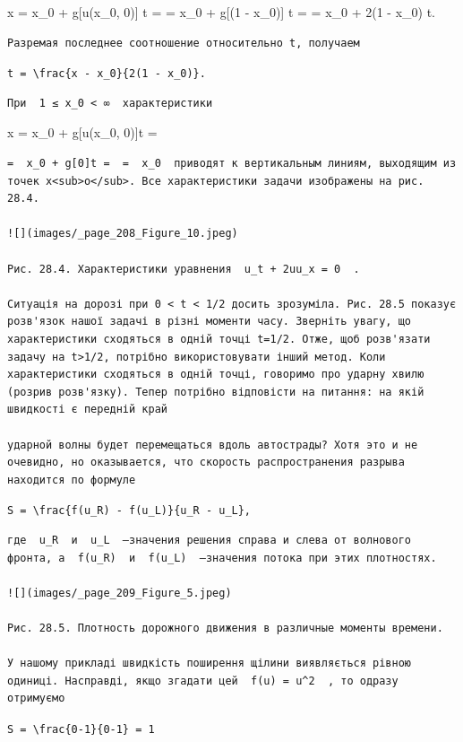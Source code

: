 \documentclass[
  ukrainian,
]{article}
\begin{document}
x = x\_0 + g{[}u(x\_0, 0){]} t = = x\_0 + g{[}(1 - x\_0){]} t = = x\_0 +
2(1 - x\_0) t.

\begin{verbatim}
Разремая последнее соотношение относительно t, получаем
\end{verbatim}

\texttt{t\ =\ \textbackslash{}frac\{x\ -\ x\_0\}\{2(1\ -\ x\_0)\}.}

\begin{verbatim}
При  1 ≤ x_0 < ∞  характеристики
\end{verbatim}

x = x\_0 + g{[}u(x\_0, 0){]}t =

\begin{verbatim}
=  x_0 + g[0]t =  =  x_0  приводят к вертикальным линиям, выходящим из точек х<sub>о</sub>. Все характеристики задачи изображены на рис. 28.4.

![](images/_page_208_Figure_10.jpeg)

Рис. 28.4. Характеристики уравнения  u_t + 2uu_x = 0  .

Ситуація на дорозі при 0 < t < 1/2 досить зрозуміла. Рис. 28.5 показує розв'язок нашої задачі в різні моменти часу. Зверніть увагу, що характеристики сходяться в одній точці t=1/2. Отже, щоб розв'язати задачу на t>1/2, потрібно використовувати інший метод. Коли характеристики сходяться в одній точці, говоримо про ударну хвилю (розрив розв'язку). Тепер потрібно відповісти на питання: на якій швидкості є передній край

ударной волны будет перемещаться вдоль автострады? Хотя это и не очевидно, но оказывается, что скорость распространения разрыва находится по формуле
\end{verbatim}

\texttt{S\ =\ \textbackslash{}frac\{f(u\_R)\ -\ f(u\_L)\}\{u\_R\ -\ u\_L\},}

\begin{verbatim}
где  u_R  и  u_L  —значения решения справа и слева от волнового фронта, а  f(u_R)  и  f(u_L)  —значения потока при этих плотностях.

![](images/_page_209_Figure_5.jpeg)

Рис. 28.5. Плотность дорожного движения в различные моменты времени.

У нашому прикладі швидкість поширення щілини виявляється рівною одиниці. Насправді, якщо згадати цей  f(u) = u^2  , то одразу отримуємо
\end{verbatim}

\texttt{S\ =\ \textbackslash{}frac\{0-1\}\{0-1\}\ =\ 1}
\end{document}
